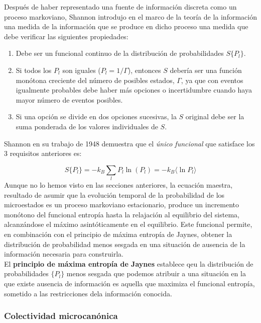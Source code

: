 \documentclass[12pt,a4paper]{article}
\numberwithin{equation}{section}
\numberwithin{figure}{section}
\theoremstyle{definition}
\begin{document}
 Después de haber representado una fuente de información discreta como un proceso markoviano, Shannon introdujo en el marco de la teoría de la información una medida de la información que se produce en dicho proceso una medida que debe verificar las siguientes propiedades:
 
\begin{enumerate}
\item Debe ser un funcional continuo de la distribución de probabilidades $S\{ P_l\}$.
\item Si todos los $P_l$ son iguales ($P_l = 1/\Gamma$), entonces $S$ debería ser una función monótona creciente del número de posibles estados, $\Gamma$, ya que con eventos igualmente probables debe haber más opciones o incertidumbre cuando haya mayor número de eventos posibles. \\
\item Si una opción se divide en dos opciones sucesivas, la $S$ original debe ser la suma ponderada de los valores individuales de $S$. 
\end{enumerate}
Shannon en su trabajo de 1948 demuestra que el \textit{único funcional} que satisface los 3 requisitos anteriores es:

\begin{equation}
S \{ P_l \} = - k_B \sum_l P_l \ln (P_l) = - k_B \langle \ln P_l \rangle
\end{equation}
Aunque no lo hemos visto en las secciones anteriores, la ecuación maestra, resultado de asumir que la evolución temporal de la probabilidad de los microestados es un proceso markoviano estacionario, produce un incremento monótono del funcional entropía hasta la relajación al equilibrio del sistema, alcanzándose el máximo asintóticamente en el equilibrio.  Este funcional permite, en combinación con el principio de máxima entropía de Jaynes, obtener la distribución de probabilidad menos sesgada en una situación de ausencia de la información necesaria para construirla. \\

El \textbf{principio de máxima entropía de Jaynes} establece qeu la distribución de probabilidades $\{ P_l \}$ menos sesgada que podemos atribuir a una situación en la que existe ausencia de información es aquella que maximiza el funcional entropía, sometido a las restricciones dela información conocida.

\subsubsection{Colectividad microcanónica}
\end{document}
